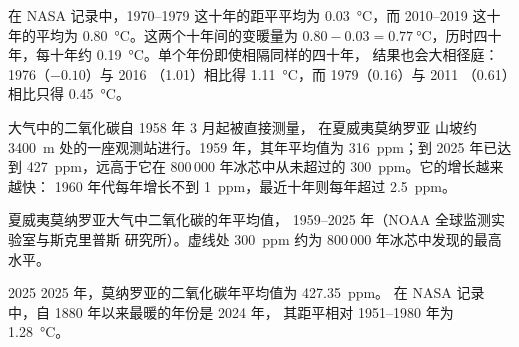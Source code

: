 \begin{example}[1970 年代以来的变暖]
在 NASA 记录中，1970--1979 这十年的距平平均为
\qty{0.03}{\degreeCelsius}，而 2010--2019 这十年的平均为
\qty{0.80}{\degreeCelsius}。这两个十年间的变暖量为
$0.80 - 0.03 = \qty{0.77}{\degreeCelsius}$，历时四十年，每十年约
\qty{0.19}{\degreeCelsius}。单个年份即使相隔同样的四十年，
结果也会大相径庭：1976（$-0.10$）与 2016
（1.01）相比得 \qty{1.11}{\degreeCelsius}，而 1979（0.16）与 2011
（0.61）相比只得 \qty{0.45}{\degreeCelsius}。
\end{example}

大气中的二氧化碳自 1958 年 3 月起被直接测量，
在夏威夷莫纳罗亚
山坡约 \qty{3400}{m} 处的一座观测站进行。1959 年，其年平均值为 \qty{316}{ppm}；到
2025 年已达到 \qty{427}{ppm}，远高于它在
800\,000 年冰芯中从未超过的 \qty{300}{ppm}。它的增长越来越快：
1960 年代每年增长不到 \qty{1}{ppm}，最近十年则每年超过
\qty{2.5}{ppm}。

\begin{omfigure}

{\small 夏威夷莫纳罗亚大气中二氧化碳的年平均值，
1959--2025 年（NOAA 全球监测实验室与斯克里普斯
研究所）。虚线处 \qty{300}{ppm} 约为
800\,000 年冰芯中发现的最高水平。}
\label{fig:g9:climate-past-and-present:co2}
\end{omfigure}

\begin{dated}{2025}
2025 年，莫纳罗亚的二氧化碳年平均值为 \qty{427.35}{ppm}。
在 NASA 记录中，自 1880 年以来最暖的年份是 2024 年，
其距平相对 1951--1980 年为 \qty{1.28}{\degreeCelsius}。
\end{dated}


